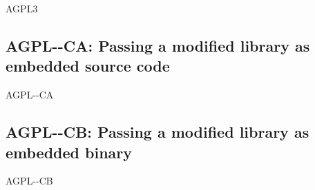 \begin{license}{AGPL3}
\subsection{AGPL-\ver-CA: Passing a modified library as embedded source code}
\begin{lsuc}{AGPL-\ver-CA}
  \label{OSUC-10S-AGPL}

  \useCaseA

  \begin{lsucrequires}
    \lsucmandatory{\keepLicenseElements}
    \lsucmandatory{\gplthreeEnsureCopyrightNoticeSource}
    \lsucmandatory{\giveLicense}\passingFilesCorrectly
    \lsucmandatory{\retainCopyrightNotices}
    \lsucmandatory{\addToCopyrightDialogLib}
    \lsucmandatory{\markEmbeddedModifications}
    \lsucmandatory{\arrangeEmbeddedChanges}\howToApplyTheseTerms
    \lsucmandatory{\arrangeEnclosingSources}
    \lsucoptional{\createChangelog}
    \lsucoptional{\addToDocumentation}
  \end{lsucrequires}

  \begin{lsucprohibits}
    \lsucitem{\noPatentLitigation}
  \end{lsucprohibits}
\end{lsuc}

\subsection{AGPL-\ver-CB: Passing a modified library as embedded binary}
\begin{lsuc}{AGPL-\ver-CB}
  \label{OSUC-10B-AGPL}
  
  \useCaseB

  \begin{lsucrequires}
    \lsucmandatory{\keepLicenseElements}
    \lsucmandatory{\gplthreeEnsureCopyrightNoticeBinary}
    \lsucmandatory{\giveLicense}\passingFilesCorrectly
    \lsucmandatory{\retainCopyrightNotices}
    \lsucmandatory{\makeAllSourcesAvailable}
    \lsucmandatory{\describeHowToGetSource}
    \lsucmandatory{\addToCopyrightDialogLib}
    \lsucmandatory{\markEmbeddedModifications}
    \lsucmandatory{\arrangeEmbeddedChanges}\howToApplyTheseTerms
    \lsucmandatory{\arrangeEnclosingBinaries}
    \lsucoptional{\createChangelog}
    \lsucoptional{\addToDocumentation}
  \end{lsucrequires}


\end{lsuc}
\end{license}
